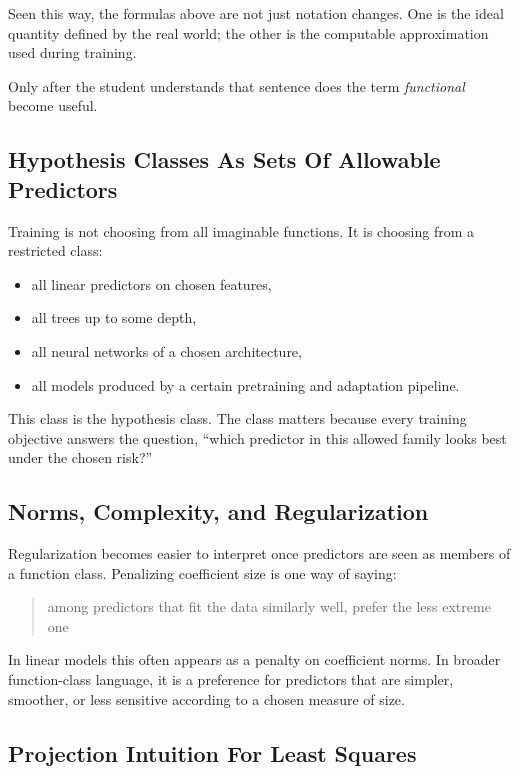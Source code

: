 Seen this way, the formulas above are not just notation changes. One is the ideal quantity defined by the real world; the other is the computable approximation used during training.

Only after the student understands that sentence does the term \emph{functional} become useful.

\subsection*{Hypothesis Classes As Sets Of Allowable Predictors}

Training is not choosing from all imaginable functions. It is choosing from a restricted class:

\begin{itemize}[leftmargin=*]
\item all linear predictors on chosen features,
\item all trees up to some depth,
\item all neural networks of a chosen architecture,
\item all models produced by a certain pretraining and adaptation pipeline.
\end{itemize}

This class is the hypothesis class. The class matters because every training objective answers the question, ``which predictor in this allowed family looks best under the chosen risk?''

\subsection*{Norms, Complexity, and Regularization}

Regularization becomes easier to interpret once predictors are seen as members of a function class. Penalizing coefficient size is one way of saying:

\begin{quote}
among predictors that fit the data similarly well, prefer the less extreme one
\end{quote}

In linear models this often appears as a penalty on coefficient norms. In broader function-class language, it is a preference for predictors that are simpler, smoother, or less sensitive according to a chosen measure of size.

\subsection*{Projection Intuition For Least Squares}

